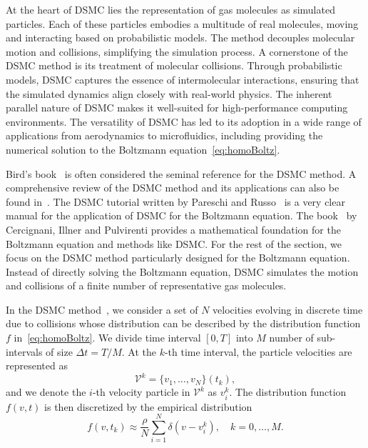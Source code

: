 \documentclass[12pt]{amsart}
\newcommand{\cal}{\mathcal}
\begin{document}
At the heart of DSMC lies the representation of gas molecules as simulated particles. Each of these particles embodies a multitude of real molecules, moving and interacting based on probabilistic models. The method decouples molecular motion and collisions, simplifying the simulation process. A cornerstone of the DSMC method is its treatment of molecular collisions. Through probabilistic models, DSMC captures the essence of intermolecular interactions, ensuring that the simulated dynamics align closely with real-world physics. 
The inherent parallel nature of DSMC makes it well-suited for high-performance computing environments.  The versatility of DSMC has led to its adoption in a wide range of applications from aerodynamics to  microfluidics, including providing the numerical solution to the Boltzmann equation~\eqref{eq:homoBoltz}. 

Bird's book~\cite{bird1994molecular} is often considered the seminal reference for the DSMC method. A comprehensive review of the DSMC method and its applications can also be found 
in~\cite{alexander1997direct}. The DSMC tutorial written by Pareschi and Russo~\cite{pareschi2001introduction} is a very clear manual for the application of DSMC for the Boltzmann equation. The book~\cite{cercignani2013mathematical} by Cercignani, Illner  and Pulvirenti provides a mathematical foundation for the Boltzmann equation and methods like DSMC. For the rest of the section, we focus on the DSMC method particularly designed for the Boltzmann equation. Instead of directly solving the Boltzmann equation, DSMC simulates the motion and collisions of a finite number of representative gas molecules.


In the DSMC method~\cite{bird1970direct,nanbu1980direct,babovsky1989convergence}, we consider a set of $N$ velocities evolving in discrete time due to collisions whose distribution can be described by the distribution function $f$ in~\eqref{eq:homoBoltz}. We divide time interval $[0,T]$ into $M$ number of sub-intervals of size $\Delta t=T/M$. At the $k$-th time interval, the particle velocities are represented as
\begin{equation*}%
{\cal V}^k =\{v_1, \ldots , v_N\} (t_k),
\end{equation*}
and we denote the $i$-th velocity particle in ${\cal V}^k $ as $v_i^k$. The distribution function $f(v,t)$ is then discretized by the empirical distribution
\begin{equation}\label{eq:empirical}
    f(v,t_k) \approx \frac{\rho}{N} \sum_{i=1}^N \delta(v-v_i^k), \quad k = 0,\ldots,M.
\end{equation}
\end{document}
